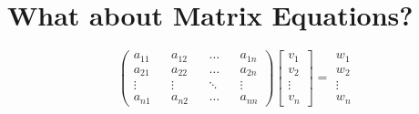 \documentclass{article}
\begin{document}
    \section{What about Matrix Equations?}
        \begin{equation*}
            \begin{pmatrix}
                a_{11}&&a_{12}&&\dots&&a_{1n}\\
                a_{21}&&a_{22}&&\dots&&a_{2n}\\
                \vdots&&\vdots&&\ddots&&\vdots\\
                a_{n1}&&a_{n2}&&\dots&&a_{nn}
            \end{pmatrix}
            \begin{bmatrix}
                v_1\\v_2\\\vdots\\v_n
            \end{bmatrix}
            =
            \begin{matrix}
                w_1\\w_2\\\vdots\\w_n
            \end{matrix}
        \end{equation*}
\end{document}
